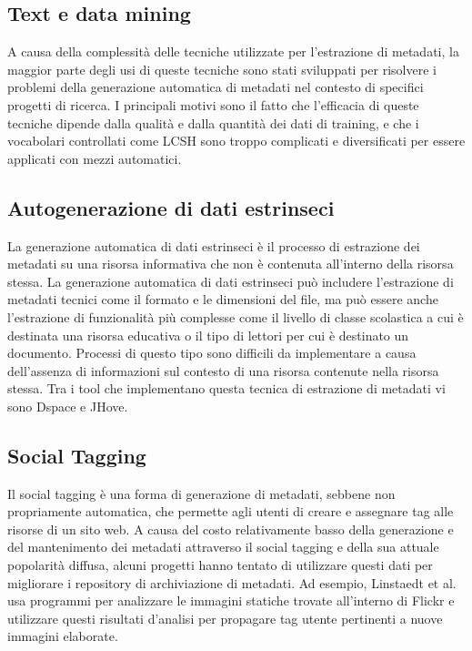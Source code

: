\subsection{Text e data mining}
A causa della complessità delle tecniche utilizzate per l'estrazione di metadati, la maggior parte degli usi di queste tecniche sono stati sviluppati per risolvere i problemi della generazione automatica di metadati nel contesto di specifici progetti di ricerca.
I principali motivi sono il fatto che l'efficacia di queste tecniche dipende dalla qualità e dalla quantità dei dati di training, e che i vocabolari controllati come LCSH sono troppo complicati e diversificati per essere applicati con mezzi automatici.

\subsection{Autogenerazione di dati estrinseci}
La generazione automatica di dati estrinseci è il processo di estrazione dei metadati su una risorsa informativa che non è contenuta all'interno della risorsa stessa. La generazione automatica di dati estrinseci può includere l'estrazione di metadati tecnici come il formato e le dimensioni del file, ma può essere anche l'estrazione di funzionalità più complesse come il livello di classe scolastica a cui è destinata una risorsa educativa o il tipo di lettori per cui è destinato un documento.
Processi di questo tipo sono difficili da implementare a causa dell'assenza di informazioni sul contesto di una risorsa
contenute nella risorsa stessa.
Tra i tool che implementano questa tecnica di estrazione di metadati vi sono Dspace e JHove.

\subsection{Social Tagging}
Il social tagging è una forma di generazione di metadati, sebbene non propriamente automatica, che permette agli utenti di creare e assegnare tag alle risorse di un sito web. A causa del costo relativamente basso della generazione e del mantenimento dei metadati attraverso il social tagging e della sua attuale popolarità diffusa, alcuni progetti hanno tentato di utilizzare questi dati per migliorare i repository di archiviazione di metadati. Ad esempio, Linstaedt et al. usa programmi per analizzare le immagini statiche trovate all'interno di Flickr e utilizzare questi risultati d'analisi per propagare tag utente pertinenti a nuove immagini elaborate.

